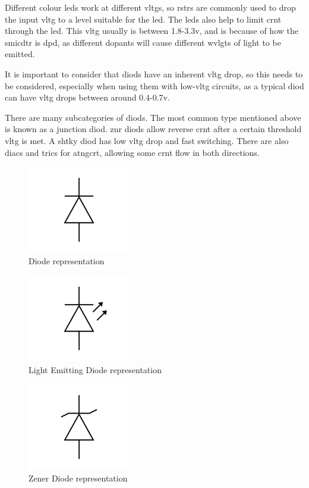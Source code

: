 \documentclass[a4paper,11pt]{report}
\begin{document}
Different colour \gls{led}s work at different \gls{vltg}s, so \gls{rstr}s are commonly used to drop the input \gls{vltg} to a level suitable for the \gls{led}. The \gls{led}s also help to limit \gls{crnt} through the \gls{led}. This \gls{vltg} usually is between 1.8-3.3v, and is because of how the \gls{smicdtr} is \gls{dpd}, as different dopants will cause different \gls{wvlgt}s of light to be emitted.

It is important to consider that \gls{diod}s have an inherent \gls{vltg} drop, so this needs to be considered, especially when using them with low-\gls{vltg} circuits, as a typical \gls{diod} can have \gls{vltg} drops between around 0.4-0.7v.

There are many subcategories of \gls{diod}s. The most common type mentioned above is known as a junction \gls{diod}. \gls{znr} \gls{diod}s allow reverse \gls{crnt} after a certain threshold \gls{vltg} is met. A \gls{shtky} \gls{diod} has low \gls{vltg} drop and fast switching. There are also \gls{diac}s and \gls{tric}s for \gls{atngcrt}, allowing some \gls{crnt} flow in both directions.

\begin{figure}[H]
\centering
\includegraphics[width=0.4\textwidth]{diode1}
\caption{Diode representation}
\end{figure}

\begin{figure}[H]
\centering
\includegraphics[width=0.4\textwidth]{diode2}
\caption{Light Emitting Diode representation}
\end{figure}

\begin{figure}[H]
\centering
\includegraphics[width=0.4\textwidth]{diode3}
\caption{Zener Diode representation}
\end{figure}
\end{document}
